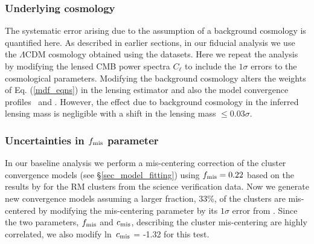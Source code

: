\subsubsection{Underlying cosmology}\label{subsec_others}
The systematic error arising due to the assumption of a background cosmology is quantified here.
As described in earlier sections, in our fiducial analysis we use the $\Lambda$CDM cosmology obtained using the \citet{planck15-13} datasets. 
Here we repeat the analysis by modifying the lensed CMB power spectra $C_{\ell}$ to include the $1\sigma$ errors to the  \citet{planck15-13} cosmological parameters.
Modifying the background cosmology alters the weights of Eq. (\ref{mdf_eqns}) in the lensing estimator and also the model convergence profiles \kappaonehalomz\ and \kappatwohalomz. 
However, the effect due to background cosmology in the inferred lensing mass is negligible with a shift in the lensing mass $\le 0.03\sigma$.
\subsubsection{Uncertainties in $f_{\rm mis}$ parameter}\label{subsec_mis-centering}
In our baseline analysis we perform a mis-centering correction of the cluster convergence models (see \S\ref{sec_model_fitting}) using $f_{\rm mis} = 0.22$ based on the results by \citet{rykoff16} for the RM clusters from the science verification data.
Now we generate new convergence models assuming a larger fraction, 33\%, of the clusters are mis-centered by modifying the mis-centering parameter by its $1\sigma$ error 
from \citet{rykoff16}. %
Since the two parameters, $f_{\rm mis}$ and $c_{\rm mis}$, describing the cluster mis-centering are highly correlated, we also modify \mbox{ln $c_{\rm mis}$} = -1.32 for this test. 

